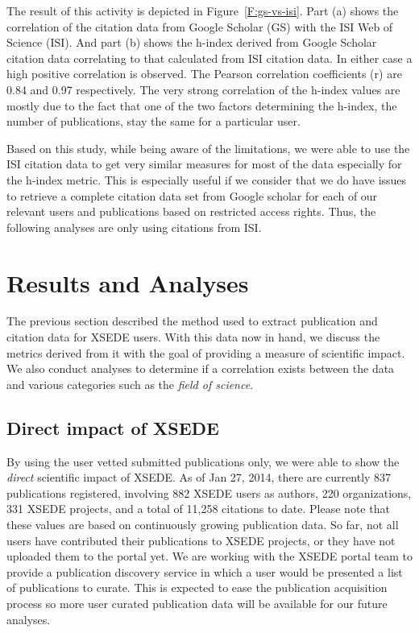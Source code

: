 \documentclass{sig-alternate}
\begin{document}
The result of this activity is depicted in Figure~\ref{F:gs-vs-isi}. Part (a) shows the correlation of the citation data from Google Scholar (GS) with the ISI Web of Science (ISI). And part (b) shows the h-index derived from Google Scholar citation data correlating to that calculated from ISI citation data. In either case a high positive correlation is observed. The Pearson correlation coefficients (r) are 0.84 and 0.97 respectively. The very strong correlation of the h-index values are mostly due to the fact that one of the two factors determining the h-index, the number of publications, stay the same for a particular user.

Based on this study, while being aware of the limitations, we were able to use the ISI citation data to get very similar measures for most of the data especially for the h-index metric. This is especially useful if we consider that we do have issues to retrieve a complete citation data set from Google scholar for each of our relevant users and publications based on restricted access rights. Thus, the following analyses are only using citations from ISI.


\section{Results and Analyses} \label{S:result}

The previous section described the method used to extract publication and citation data for XSEDE users.  With this data now in hand, we discuss the metrics derived from it with the goal of providing a measure of scientific impact. We also conduct analyses to determine if a correlation exists between the data and various categories such as the {\em field of science}.
 
\subsection{Direct impact of XSEDE} 
 
By using the user vetted submitted publications only, we were able to show the \emph{direct} scientific impact of XSEDE.  As of Jan 27, 2014, there are currently 837 publications registered, involving 882 XSEDE users as authors, 220 organizations, 331 XSEDE projects, and a total of 11,258 citations to date. Please note that these values are based on continuously growing publication data. So far, not all users have contributed their publications to XSEDE projects, or they have not uploaded them to the portal yet. We are working with the XSEDE portal team to provide a publication discovery service in which a user would be presented a list of publications to curate. This is expected to ease the publication acquisition process so more user curated publication data will be available for our future analyses.
\end{document}
